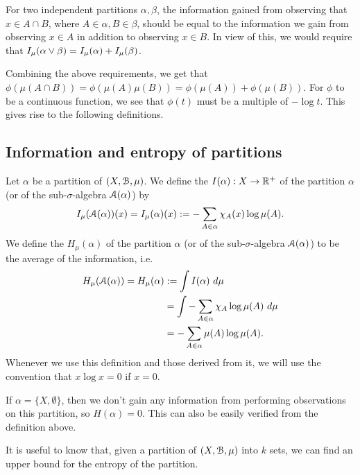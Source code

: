 For two independent partitions $\alpha, \beta$, the information gained from observing that $x \in A \cap B$, where $A \in \alpha, B \in \beta$, should be equal to the information we gain from observing $x \in A$ in addition to observing $x \in B$. In view of this, we would require that $I_\mu(\alpha \vee \beta) = I_\mu(\alpha) + I_\mu(\beta)$.

Combining the above requirements, we get that $\phi(\mu(A \cap B)) = \phi(\mu(A)\mu(B)) = \phi(\mu(A)) + \phi(\mu(B))$. For $\phi$ to be a continuous function, we see that $\phi(t)$ must be a multiple of $-\log{t}$. This gives rise to the following definitions.

\subsection{Information and entropy of partitions}
\begin{definition}
	Let $\alpha$ be a partition of $(X, \mathcal{B}, \mu)$. We define the  $I(\alpha) : X \to \mathbb{R}^+$ of the partition $\alpha$ (or of the sub-$\sigma$-algebra $\mathcal{A}(\alpha)$) by
	\[
		I_\mu(\mathcal{A}(\alpha))(x) = I_\mu(\alpha)(x) := -\sum_{A \in \alpha}{\chi_A(x) \log{\mu(A)}}.
	\]
	We define the  $H_\mu(\alpha)$ of the partition $\alpha$ (or of the sub-$\sigma$-algebra $\mathcal{A}(\alpha)$) to be the average of the information, i.e.
	\begin{align*}
		H_\mu(\mathcal{A}(\alpha)) = H_\mu(\alpha) &:= \int{I(\alpha)\ d\mu} \\
			&= \int{-\sum_{A \in \alpha}{\chi_A \log{\mu(A)}}\ d\mu} \\
			&= -\sum_{A \in \alpha}{\mu(A) \log{\mu(A)}}.
	\end{align*}
	Whenever we use this definition and those derived from it, we will use the convention that $x \log x = 0$ if $x = 0$.
\end{definition}

\begin{remark}
	If $\alpha = \{X, \emptyset\}$, then we don't gain any information from performing observations on this partition, so $H(\alpha) = 0$. This can also be easily verified from the definition above.
\end{remark}

It is useful to know that, given a partition of $(X, \mathcal{B}, \mu)$ into $k$ sets, we can find an upper bound for the entropy of the partition.

